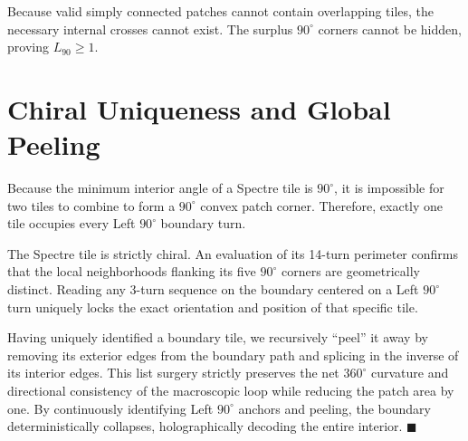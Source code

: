 \documentclass[11pt, a4paper]{amsart}
\begin{document}
Because valid simply connected patches cannot contain overlapping tiles, the necessary internal crosses cannot exist. The surplus $90^\circ$ corners cannot be hidden, proving $L_{90} \ge 1$.

\section{Chiral Uniqueness and Global Peeling}
Because the minimum interior angle of a Spectre tile is $90^\circ$, it is impossible for two tiles to combine to form a $90^\circ$ convex patch corner. Therefore, exactly one tile occupies every Left $90^\circ$ boundary turn.

The Spectre tile is strictly chiral. An evaluation of its 14-turn perimeter confirms that the local neighborhoods flanking its five $90^\circ$ corners are geometrically distinct. Reading any 3-turn sequence on the boundary centered on a Left $90^\circ$ turn uniquely locks the exact orientation and position of that specific tile.

Having uniquely identified a boundary tile, we recursively ``peel'' it away by removing its exterior edges from the boundary path and splicing in the inverse of its interior edges. This list surgery strictly preserves the net $360^\circ$ curvature and directional consistency of the macroscopic loop while reducing the patch area by one. By continuously identifying Left $90^\circ$ anchors and peeling, the boundary deterministically collapses, holographically decoding the entire interior. $\blacksquare$
\end{document}
